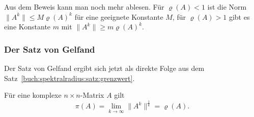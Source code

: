 Aus dem Beweis kann man noch mehr ablesen.
Für $\varrho(A)< 1$ ist die Norm $ \|A^k\| \le M \varrho(A)^k$ für eine
geeignete Konstante $M$,
für $\varrho(A) > 1$ gibt es eine Konstante $m$ mit
$\|A^k\| \ge m\varrho(A)^k$.

\subsubsection{Der Satz von Gelfand}
Der Satz von Gelfand ergibt sich jetzt als direkte Folge aus dem
Satz~\ref{buch:spektralradius:satz:grenzwert}.

\begin{satz}[Gelfand]
%
%
\label{buch:satz:gelfand}
Für eine komplexe $n\times n$-Matrix $A$ gilt
\[
\pi(A)
=
\lim_{k\to\infty}\|A^k\|^\frac1k
=
\varrho(A).
\]
\end{satz}

